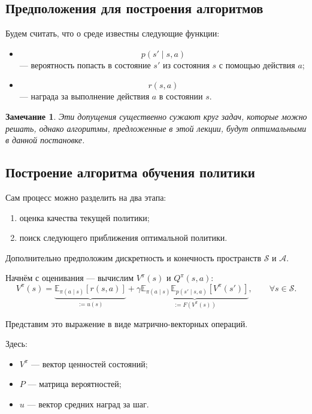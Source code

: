 \documentclass[12pt,a4paper]{article}
\newtheorem{remark}{Замечание}
\begin{document}
\subsection{Предположения для построения алгоритмов}

Будем считать, что о среде известны следующие функции:

\begin{itemize}
    \item
    \[
    p(s' \mid s,a)
    \]
    --- вероятность попасть в состояние $s'$ из состояния $s$ с помощью действия $a$;

    \item
    \[
    r(s,a)
    \]
    --- награда за выполнение действия $a$ в состоянии $s$.
\end{itemize}

\begin{remark}
Эти допущения существенно сужают круг задач, которые можно решать, однако алгоритмы, предложенные в этой лекции, будут оптимальными в данной постановке.
\end{remark}

\subsection{Построение алгоритма обучения политики}

Сам процесс можно разделить на два этапа:
\begin{enumerate}
    \item оценка качества текущей политики;
    \item поиск следующего приближения оптимальной политики.
\end{enumerate}

Дополнительно предположим дискретность и конечность пространств $\mathcal S$ и $\mathcal A$.

Начнём с оценивания --- вычислим $V^\pi(s)$ и $Q^\pi(s,a)$:
\[
V^\pi(s)
=
\underbrace{
\mathbb E_{\pi(a\mid s)}
\left[
r(s,a)
\right]
}_{:=u(s)}
+
\gamma
\underbrace{
\mathbb E_{\pi(a\mid s)}
\mathbb E_{p(s'\mid s,a)}
\left[
V^\pi(s')
\right]
}_{:=F(V^\pi(s))},
\qquad
\forall s \in \mathcal S.
\]

Представим это выражение в виде матрично-векторных операций.

Здесь:
\begin{itemize}
    \item $V^\pi$ --- вектор ценностей состояний;
    \item $P$ --- матрица вероятностей;
    \item $u$ --- вектор средних наград за шаг.
\end{itemize}
\end{document}
